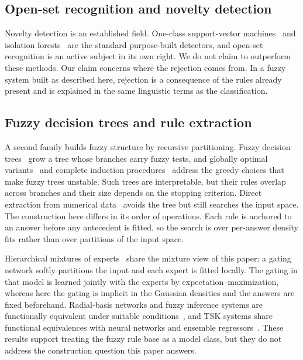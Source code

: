 \documentclass[journal]{IEEEtran}
\begin{document}
\subsection{Open-set recognition and novelty detection}
Novelty detection is an established field. One-class support-vector machines~\cite{scholkopf2001estimating} and isolation forests~\cite{liu2008isolation} are the standard purpose-built detectors, and open-set recognition is an active subject in its own right. We do not claim to outperform these methods. Our claim concerns where the rejection comes from. In a fuzzy system built as described here, rejection is a consequence of the rules already present and is explained in the same linguistic terms as the classification.

\subsection{Fuzzy decision trees and rule extraction}
A second family builds fuzzy structure by recursive partitioning. Fuzzy decision trees~\cite{janikow1998fuzzy,yuan1995induction} grow a tree whose branches carry fuzzy tests, and globally optimal variants~\cite{suarez1999globally} and complete induction procedures~\cite{olaru2003complete} address the greedy choices that make fuzzy trees unstable. Such trees are interpretable, but their rules overlap across branches and their size depends on the stopping criterion. Direct extraction from numerical data~\cite{abe1995method} avoids the tree but still searches the input space. The construction here differs in its order of operations. Each rule is anchored to an answer before any antecedent is fitted, so the search is over per-answer density fits rather than over partitions of the input space.

Hierarchical mixtures of experts~\cite{jordan1994hierarchical} share the mixture view of this paper: a gating network softly partitions the input and each expert is fitted locally. The gating in that model is learned jointly with the experts by expectation--maximization, whereas here the gating is implicit in the Gaussian densities and the answers are fixed beforehand. Radial-basis networks and fuzzy inference systems are functionally equivalent under suitable conditions~\cite{jang1993functional}, and TSK systems share functional equivalences with neural networks and ensemble regressors~\cite{wu2020functional}. These results support treating the fuzzy rule base as a model class, but they do not address the construction question this paper answers.
\end{document}
